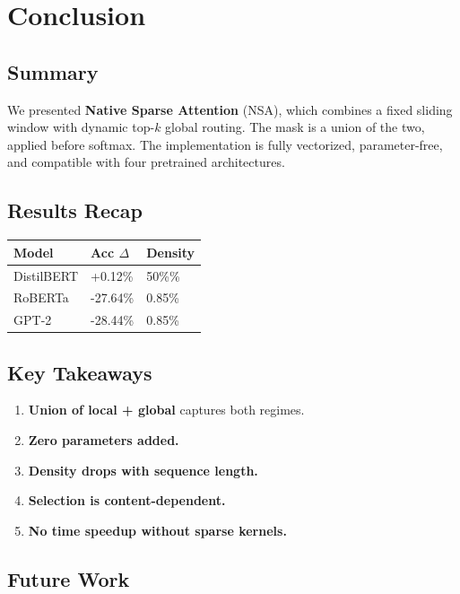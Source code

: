 
\section{Conclusion}

\subsection{Summary}

We presented \textbf{Native Sparse Attention} (NSA), which combines a fixed 
sliding window with dynamic top-$k$ global routing. The mask is a union of 
the two, applied before softmax. The implementation is fully vectorized, 
parameter-free, and compatible with four pretrained architectures.

\subsection{Results Recap}

\begin{table}[H]
\centering
\small
\begin{tabular}{lll}
\toprule
\textbf{Model} & \textbf{Acc $\Delta$} & \textbf{Density} \\
\midrule
DistilBERT & +0.12\% & 50\%\% \\
RoBERTa & -27.64\% & 0.85\% \\
GPT-2 & -28.44\% & 0.85\% \\
\bottomrule
\end{tabular}
\end{table}

\subsection{Key Takeaways}

\begin{enumerate}
\item \textbf{Union of local + global} captures both regimes.
\item \textbf{Zero parameters added.}
\item \textbf{Density drops with sequence length.}
\item \textbf{Selection is content-dependent.}
\item \textbf{No time speedup without sparse kernels.}

\end{enumerate}
\subsection{Future Work}

